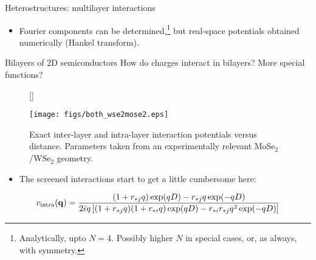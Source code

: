 \documentclass[12pt, pdf, hyperref={draft}, usenames, dvipsnames]{beamer}
\begin{document}
\begin{frame}{Heterostructures: multilayer interactions}
\begin{itemize}
  \begin{figure}[H]
    [\FBwidth]
    {\caption{A tri-layer heterostructure of 2D semiconductors. There are $N$
    layer potentials, and $N(N-1)/2$ inter-layer potentials.}\label{fig:multilayers}}
    {\texttt{[image: figs/multilayers.pdf]}}
  \end{figure}

  \item Fourier components can be
  determined,\footnote{Analytically, upto $N=4$. Possibly higher $N$ in
  special cases, or, as always, with symmetry.} but
  real-space potentials obtained numerically (Hankel transform).
\end{itemize}
\end{frame}

\begin{frame}{Bilayers of 2D semiconductors}
How do charges interact in bilayers? More special functions?
\begin{figure}[H]
  [\FBwidth]
  {\caption{Exact inter-layer and intra-layer interaction potentials versus
  distance. Parameters taken from an experimentally relevant MoSe$_2$/WSe$_2$
  geometry.}\label{fig:interactions}}
  {\texttt{[image: figs/both\_wse2mose2.eps]}}
\end{figure}

\begin{itemize}
  \item The screened interactions start to get a little cumbersome here:
\end{itemize}
\begin{equation}
  v_{\text{intra}}({\bf q}) =
  \frac{(1+r_{*j}q)\exp(qD)
  -r_{*j}q\exp(-qD)}{2\bar{\epsilon}
  q\left[(1+r_{*j}q)(1+r_{*i}q)\exp(qD)-
  r_{*i}r_{*j}q^2\exp(-qD)\right]} \label{eq:intralayer_pot}
\end{equation}
\end{frame}
\end{document}
